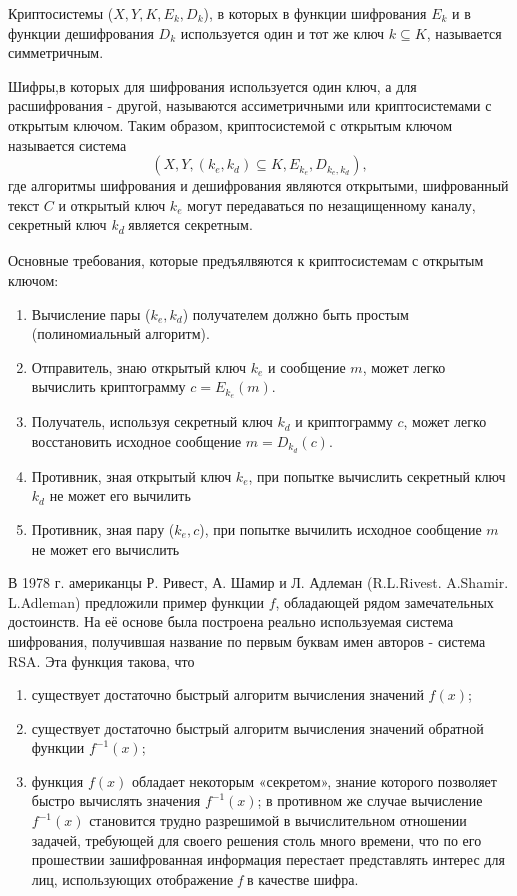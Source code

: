   Криптосистемы ($X, Y, K, E_{k}, D_{k}$), в которых в функции шифрования $E_{k}$ и в функции 
дешифрования $D_{k}$ используется один и тот же ключ $k \subseteq K$, называется симметричным. 

  Шифры,в которых для шифрования используется один ключ, а для расшифрования - другой, называются ассиметричными или криптосистемами с открытым ключом. Таким образом, криптосистемой с открытым ключом называется система 
  \begin{equation}
    (X, Y, (k_{e}, k_{d}) \subseteq K, E_{k_{e}}, D_{k_{e},k_{d}}), 
  \end{equation}
  где алгоритмы шифрования и дешифрования являются открытыми, шифрованный текст $C$ и открытый ключ $k_{e}$ могут 
передаваться по незащищенному каналу, секретный ключ \textit{k\textsubscript{d}} является секретным.

Основные требования, которые предъялвяются к криптосистемам с открытым ключом:
\begin{enumerate}
	\item Вычисление пары ($k_{e}, k_{d}$) получателем должно быть простым (полиномиальный алгоритм).
	\item Отправитель, знаю открытый ключ $k_{e}$ и сообщение $m$, может легко вычислить криптограмму 
$c = E_{k_{e}}(m)$.
	\item Получатель, используя секретный ключ $k_{d}$ и криптограмму $c$, может легко восстановить исходное сообщение 
$m = D_{k_{d}}(c)$.
	\item Противник, зная открытый ключ $k_{e}$, при попытке вычислить секретный ключ $k_{d}$ не может его 
вычилить
	\item Противник, зная пару ($k_{e}, c$), при попытке вычилить исходное сообщение $m$ не может его вычислить
\end{enumerate}

  В 1978 г. американцы Р. Ривест, А. Шамир и Л. Адлеман (R.L.Rivest. A.Shamir. L.Adleman) предложили пример функции $f$, обладающей рядом 
замечательных достоинств. На её основе была построена реально используемая система шифрования, получившая название по первым буквам имен авторов - 
система RSA. Эта функция такова, что
\begin{enumerate}
    \item существует достаточно быстрый алгоритм вычисления значений $f(x)$;
    \item существует достаточно быстрый алгоритм вычисления значений обратной функции $f^{ -1}(x)$;
    \item функция $f(x)$ обладает некоторым «секретом», знание которого позволяет быстро вычислять значения $f^{ -1}(x)$;
в противном же случае вычисление $f^{ -1}(x)$ становится трудно разрешимой в вычислительном отношении задачей, требующей для 
своего решения столь много времени, что по его прошествии зашифрованная информация перестает представлять интерес для лиц, 
использующих отображение \textit{f} в качестве шифра.
\end{enumerate}	

